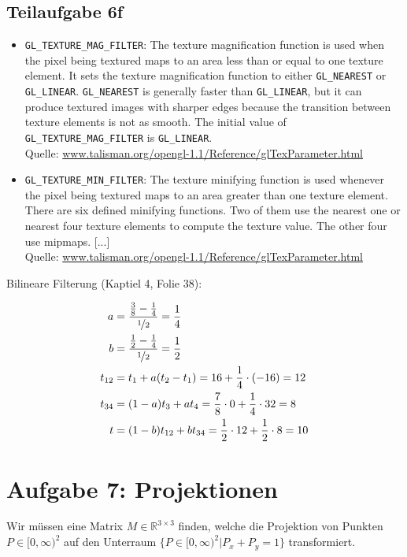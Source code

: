 \documentclass[a4paper]{scrartcl}
\begin{document}
\subsection*{Teilaufgabe 6f}
\begin{itemize}
    \item \texttt{GL\_TEXTURE\_MAG\_FILTER}: The texture magnification function
    is used when the pixel being textured maps to an area less than or equal to
    one texture element. It sets the texture magnification function to either
    \texttt{GL\_NEAREST} or \texttt{GL\_LINEAR}. \texttt{GL\_NEAREST} is
    generally faster than
    \texttt{GL\_LINEAR}, but it can produce textured images with sharper edges
    because the transition between texture elements is not as smooth. The
    initial value of \texttt{GL\_TEXTURE\_MAG\_FILTER} is \texttt{GL\_LINEAR}.\\
    Quelle: \href{https://www.talisman.org/opengl-1.1/Reference/glTexParameter.html}{www.talisman.org/opengl-1.1/Reference/glTexParameter.html}
    \item \texttt{GL\_TEXTURE\_MIN\_FILTER}: The texture minifying function is used whenever the pixel being textured maps to an area greater than one texture element. There are six defined minifying functions. Two of them use the nearest one or nearest four texture elements to compute the texture value. The other four use mipmaps. [...]\\
    Quelle: \href{https://www.talisman.org/opengl-1.1/Reference/glTexParameter.html}{www.talisman.org/opengl-1.1/Reference/glTexParameter.html}
\end{itemize}

Bilineare Filterung (Kaptiel 4, Folie 38):

\begin{align}
    a &= \frac{\frac{3}{8} - \frac{1}{4}}{\nicefrac{1}{2}} = \frac{1}{4}\\
    b &= \frac{\frac{1}{2} - \frac{1}{4}}{\nicefrac{1}{2}} = \frac{1}{2}\\
    t_{12} &= t_1 + a(t_2 - t_1) = 16 + \frac{1}{4} \cdot (-16) = 12\\
    t_{34} &= (1-a) t_3 + a t_4 = \frac{7}{8} \cdot 0 + \frac{1}{4} \cdot 32 = 8\\
    t &= (1-b) t_{12} + b t_{34} = \frac{1}{2} \cdot 12 + \frac{1}{2} \cdot 8 = 10
\end{align}

\clearpage
\section*{Aufgabe 7: Projektionen}
Wir müssen eine Matrix $M \in \mathbb{R}^{3 \times 3}$ finden, welche die
Projektion von Punkten $P \in [0, \infty)^2$ auf den Unterraum
$\{P \in [0, \infty)^2 | P_x + P_y = 1\}$ transformiert.
\end{document}
